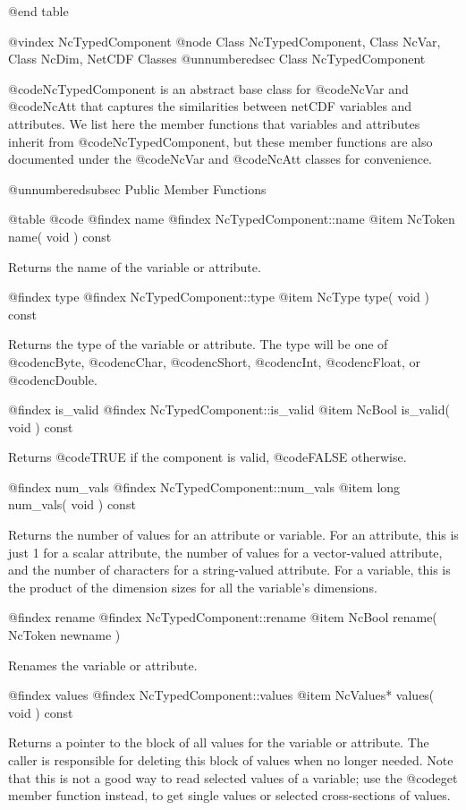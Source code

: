 @end table

@vindex NcTypedComponent
@node Class NcTypedComponent, Class NcVar, Class NcDim, NetCDF Classes
@unnumberedsec  Class NcTypedComponent

@code{NcTypedComponent} is an abstract base class for @code{NcVar} and
@code{NcAtt} that captures the similarities between netCDF variables and
attributes.  We list here the member functions that variables and
attributes inherit from @code{NcTypedComponent}, but these member
functions are also documented under the @code{NcVar} and @code{NcAtt}
classes for convenience.

@unnumberedsubsec Public Member Functions

@table @code
@findex name
@findex NcTypedComponent::name
@item NcToken name( void ) const

Returns the name of the variable or attribute.

@findex type
@findex NcTypedComponent::type
@item NcType type( void ) const

Returns the type of the variable or attribute.  The type will be one of
@code{ncByte}, @code{ncChar}, @code{ncShort}, @code{ncInt},
@code{ncFloat}, or @code{ncDouble}.

@findex is_valid
@findex NcTypedComponent::is_valid
@item NcBool is_valid( void ) const

Returns @code{TRUE} if the component is valid, @code{FALSE} otherwise.

@findex num_vals
@findex NcTypedComponent::num_vals
@item long num_vals( void ) const

Returns the number of values for an attribute or variable.  For an
attribute, this is just 1 for a scalar attribute, the number of values
for a vector-valued attribute, and the number of characters for a
string-valued attribute.  For a variable, this is the product of the
dimension sizes for all the variable's dimensions.

@findex rename
@findex NcTypedComponent::rename
@item NcBool rename( NcToken newname )

Renames the variable or attribute.

@findex values
@findex NcTypedComponent::values
@item NcValues* values( void ) const

Returns a pointer to the block of all values for the variable or
attribute.  The caller is responsible for deleting this block of values
when no longer needed.  Note that this is not a good way to read
selected values of a variable; use the @code{get} member function
instead, to get single values or selected cross-sections of values.

